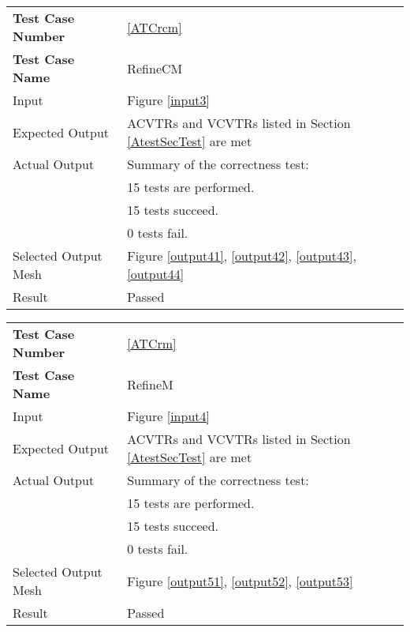 \documentclass[12pt,titlepage]{article}
\begin{document}
\vspace{1cm}
\begin{minipage}{\textwidth}
\begin{tabular}{p{\colAwidth}|p{\colBwidth}} 
\hline \hline 
{\bf Test Case Number} & \cref{ATCrcm} \\ 
{\bf Test Case Name} & RefineCM\\ 
\hline
Input & Figure \ref{input3}\\
Expected Output & ACVTRs and VCVTRs listed in Section \ref{AtestSecTest} are met\\
Actual Output & Summary of the correctness test:\\
& 15 tests are performed.\\
& 15 tests succeed.\\
& 0 tests fail.\\
Selected Output Mesh & Figure \ref{output41}, \ref{output42}, \ref{output43}, \ref{output44}\\
Result & Passed\\
\hline \hline
\end{tabular}
\end{minipage}

\vspace{1cm}
\begin{minipage}{\textwidth}
\begin{tabular}{p{\colAwidth}|p{\colBwidth}} 
\hline \hline 
{\bf Test Case Number} & \cref{ATCrm} \\ 
{\bf Test Case Name} & RefineM\\ 
\hline
Input & Figure \ref{input4}\\
Expected Output & ACVTRs and VCVTRs listed in Section \ref{AtestSecTest} are met\\
Actual Output & Summary of the correctness test:\\
& 15 tests are performed.\\
& 15 tests succeed.\\
& 0 tests fail.\\
Selected Output Mesh & Figure \ref{output51}, \ref{output52}, \ref{output53}\\
Result & Passed\\
\hline \hline
\end{tabular}
\end{minipage}
\end{document}
